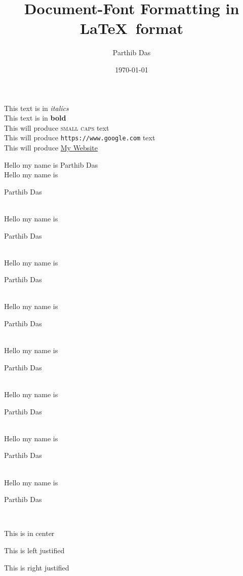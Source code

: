 \documentclass[11pt]{article}
\title{Document-Font Formatting in \LaTeX\ format}
\author{Parthib Das}
\date{\today}
\begin{document}
\maketitle
\pagebreak
\tableofcontents

\pagebreak
This text is in \textit{italics}\\
This text is in \textbf{bold}\\
This will produce \textsc{small caps} text\\
This will produce \texttt{https://www.google.com} text\\
This will produce \href{http://www.google.com}{My Website}\\

\vspace{1cm}

Hello my name is Parthib Das\\[6pt]
Hello my name is \begin{large}Parthib Das\end{large}\\[6pt]
Hello my name is \begin{Large}Parthib Das\end{Large}\\[6pt]
Hello my name is \begin{huge}Parthib Das\end{huge}\\[6pt]
Hello my name is \begin{Huge}Parthib Das\end{Huge}\\[6pt]

Hello my name is \begin{normalsize}Parthib Das
\end{normalsize}\\[6pt]
Hello my name is \begin{small}Parthib Das\end{small}\\[6pt]
Hello my name is \begin{scriptsize} Parthib
Das\end{scriptsize}\\[6pt]
Hello my name is \begin{tiny}Parthib Das\end{tiny}\\[6pt]

\vspace{1cm}

\begin{samepage}
\begin{center}
This is in center
\end{center}
\begin{flushleft}
This is left justified
\end{flushleft}
\begin{flushright}
This is right justified
\end{flushright}
\end{samepage}
\end{document}
